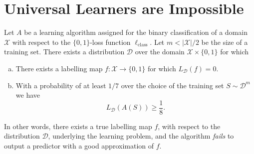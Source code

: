 \section{Universal Learners are Impossible}

\begin{theorem}
    \label{thm:no-free-lunch}
    Let \(A\) be a learning algorithm assigned for the binary classification of a
    domain \(\mathcal{X}\) with respect to the \(\{0, 1\}\)-loss function
    \(\ell_{\text{class}}\). Let \(m < |\mathcal{X}|/2\) be the size of a training
    set. There exists a distribution \(\mathcal{D}\) over the domain
    \(\mathcal{X} \times \{0, 1\}\) for which
    \begin{enumerate}[(a)]\setlength\itemsep{0em}
        \item There exists a labelling map \(f: \mathcal{X} \to \{0, 1\}\) for which
              \(L_{\mathcal{D}}(f) = 0\).
        \item With a probability of at least \(1/7\) over the choice of the training set
              \(S \sim \mathcal{D}^m\) we have
              \[
                  L_{\mathcal{D}}(A(S)) \geq \frac{1}{8}.
              \]
    \end{enumerate}
    In other words, there exists a true labelling map \(f\), with respect to the
    distribution \(\mathcal{D}\), underlying the learning problem, and the algorithm
    \emph{fails} to output a predictor with a good approximation of \(f\).
\end{theorem}

